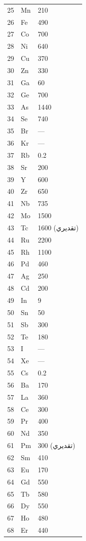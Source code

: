 \documentclass[11pt,a4paper]{article}
\begin{document}
\begin{otherlanguage}{arabic}
\begin{longtable}{p{0.6cm}p{1.2cm}p{2.5cm}}
			25 & Mn & 210 \\
			26 & Fe & 490 \\
			27 & Co & 700 \\
			28 & Ni & 640 \\
			29 & Cu & 370 \\
			30 & Zn & 330 \\
			31 & Ga & 60 \\
			32 & Ge & 700 \\
			33 & As & 1440 \\
			34 & Se & 740 \\
			35 & Br & — \\
			36 & Kr & — \\
			37 & Rb & 0.2 \\
			38 & Sr & 200 \\
			39 & Y  & 600 \\
			40 & Zr & 650 \\
			41 & Nb & 735 \\
			42 & Mo & 1500 \\
			43 & Tc & 1600 (تقديري) \\
			44 & Ru & 2200 \\
			45 & Rh & 1100 \\
			46 & Pd & 460 \\
			47 & Ag & 250 \\
			48 & Cd & 200 \\
			49 & In & 9 \\
			50 & Sn & 50 \\
			51 & Sb & 300 \\
			52 & Te & 180 \\
			53 & I  & — \\
			54 & Xe & — \\
			55 & Cs & 0.2 \\
			56 & Ba & 170 \\
			57 & La & 360 \\
			58 & Ce & 300 \\
			59 & Pr & 400 \\
			60 & Nd & 350 \\
			61 & Pm & 300 (تقديري) \\
			62 & Sm & 410 \\
			63 & Eu & 170 \\
			64 & Gd & 550 \\
			65 & Tb & 580 \\
			66 & Dy & 550 \\
			67 & Ho & 480 \\
			68 & Er & 440 \\

\end{longtable}
\end{otherlanguage}
\end{document}
